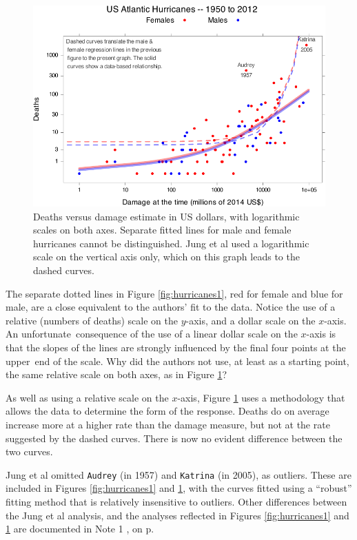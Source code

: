 \documentclass[
  10pt,
  b5paper]{book}
\begin{document}
\begin{figure}[H]

{\centering \includegraphics[width=0.8\linewidth]{08-observational_files/figure-latex/hurricanes2-1} 

}

\caption{Deaths versus damage estimate in US dollars, with logarithmic scales
               on both axes. Separate fitted lines for male and female
               hurricanes cannot be distinguished. Jung et al used a 
               logarithmic scale on the vertical axis only, which on
               this graph leads to the dashed curves.}\label{fig:hurricanes2}
\end{figure}

The separate dotted lines in Figure \ref{fig:hurricanes1}, red for
female and blue for male, are a close equivalent to the authors' fit
to the data. Notice the use of a relative (numbers of deaths) scale
on the \(y\)-axis, and a dollar scale on the \(x\)-axis.
An unfortunate~consequence of the use of a linear dollar scale
on the \(x\)-axis is that the slopes of the lines are strongly
influenced by the final four points at the upper~end of the scale.
Why did the authors not use, at least as a starting point, the same relative scale on both axes, as in Figure
\ref{fig:hurricanes2}?

As well as using a relative scale on the \(x\)-axis, Figure
\ref{fig:hurricanes2} uses a methodology that allows the
data to determine the form of the response. Deaths do on
average increase more at a higher rate than the damage measure,
but not at the rate suggested by the dashed curves. There
is now no evident difference between the two curves.

Jung et al omitted \texttt{Audrey} (in 1957) and \texttt{Katrina} (in 2005), as
outliers. These are included in Figures \ref{fig:hurricanes1} and \ref{fig:hurricanes2}, with the curves fitted using a ``robust''
fitting method that is relatively insensitive to outliers.
Other differences between the Jung et al analysis, and the
analyses reflected in Figures \ref{fig:hurricanes1} and
\ref{fig:hurricanes2} are documented in Note 1
, on p.~\pageref{hurricanes}
\end{document}

